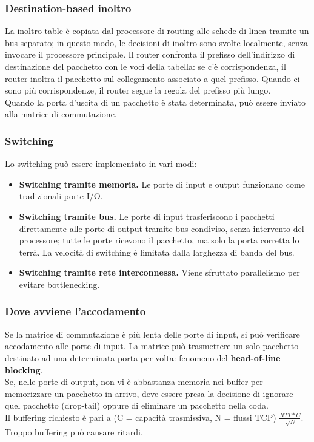 \documentclass[11pt]{article}
\begin{document}
\subsubsection{Destination-based inoltro}
La inoltro table è copiata dal processore di routing alle schede di linea tramite un bus separato; in questo modo, le 
decisioni di inoltro sono svolte localmente, senza invocare il processore principale. Il router confronta il prefisso 
dell'indirizzo di destinazione del pacchetto con le voci della tabella: se c'è corrispondenza, il router inoltra il pacchetto 
sul collegamento associato a quel prefisso. Quando ci sono più corrispondenze, il router segue la regola del prefisso più 
lungo.\\
Quando la porta d'uscita di un pacchetto è stata determinata, può essere inviato alla matrice di commutazione.
\subsubsection{Switching}
Lo switching può essere implementato in vari modi:
\begin{itemize}
    \item \textbf{Switching tramite memoria.} Le porte di input e output funzionano come tradizionali porte I/O.
    \item \textbf{Switching tramite bus.} Le porte di input trasferiscono i pacchetti direttamente alle porte di output 
    tramite bus condiviso, senza intervento del processore; tutte le porte ricevono il pacchetto, ma solo la porta corretta 
    lo terrà. La velocità di switching è limitata dalla larghezza di banda del bus.
    \item \textbf{Switching tramite rete interconnessa.} Viene sfruttato parallelismo per evitare bottlenecking.
\end{itemize}
\subsubsection{Dove avviene l'accodamento}
Se la matrice di commutazione è più lenta delle porte di input, si può verificare accodamento alle porte di input. La matrice 
può trasmettere un solo pacchetto destinato ad una determinata porta per volta: fenomeno del \textbf{head-of-line blocking}.\\ 
Se, nelle porte di output, non vi è abbastanza memoria nei buffer per memorizzare un pacchetto in arrivo, deve essere presa 
la decisione di ignorare quel pacchetto (drop-tail) oppure di eliminare un pacchetto nella coda.\\
Il buffering richiesto è pari a (C = capacità trasmissiva, N = flussi TCP) $\frac{RTT*C}{\sqrt[]{N}}$. Troppo buffering 
può causare ritardi.
\end{document}
